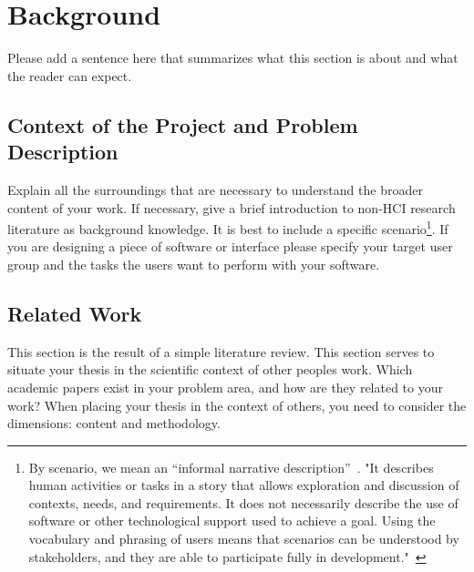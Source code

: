 \section{Background}
\label{sec:background}
Please add a sentence here that summarizes what this section is about and what the reader can expect.
\subsection{Context of the Project and Problem Description} 
\label{sec:context}
Explain all the surroundings that are necessary to understand the broader content of your work. If necessary, give a brief introduction to non-HCI research literature as background knowledge. It is best to include a specific scenario\footnote{By scenario, we mean an “informal narrative description”~\cite{carrol1999five}. "It describes human activities or tasks in a story that allows exploration and discussion of contexts, needs, and requirements. It does not necessarily describe the use of software or other technological support used to achieve a goal. Using the vocabulary and phrasing of users means that scenarios can be understood by stakeholders, and they are able to participate fully in development."~\cite{preeceInteractionDesignHumancomputer2015}}. If you are designing a piece of software or interface please specify your target user group and the tasks the users want to perform with your software.

\subsection{Related Work}
\label{sec:relatedwork}
This section is the result of a simple literature review. This section serves to situate your thesis in the scientific context of other peoples work. Which academic papers exist in your problem area, and how are they related to your work? When placing your thesis in the context of others, you need to consider the dimensions: content and methodology.

